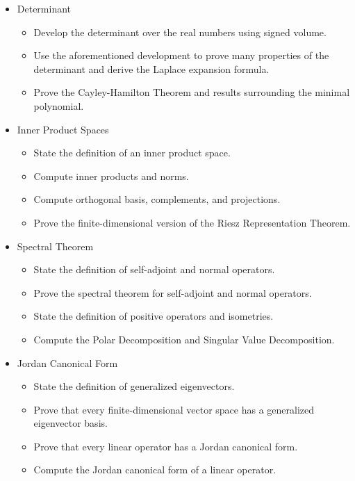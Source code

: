 \documentclass[11pt, a4paper]{article}
\begin{document}
\begin{itemize}
\item Determinant
    \begin{itemize}
    \item	Develop the determinant over the real numbers using signed volume.
    \item	Use the aforementioned development to prove many properties of the determinant and derive the Laplace expansion formula.
    \item	Prove the Cayley-Hamilton Theorem and results surrounding the minimal polynomial. 
    \end{itemize}  
    
\item Inner Product Spaces
    \begin{itemize}
    \item	State the definition of an inner product space.
    \item	Compute inner products and norms.
    \item	Compute orthogonal basis, complements, and projections. 
    \item	Prove the finite-dimensional version of the Riesz Representation Theorem. 
    \end{itemize}  
    
\item Spectral Theorem
    \begin{itemize}
    \item	State the definition of self-adjoint and normal operators.
    \item	Prove the spectral theorem for self-adjoint and normal operators.
    \item	State the definition of positive operators and isometries.
    \item	Compute the Polar Decomposition and Singular Value Decomposition. 
    \end{itemize}

\item Jordan Canonical Form
    \begin{itemize}
    \item	State the definition of generalized eigenvectors.
    \item	Prove that every finite-dimensional vector space has a generalized eigenvector basis.
    \item	Prove that every linear operator has a Jordan canonical form.
    \item	Compute the Jordan canonical form of a linear operator. 
    \end{itemize}
\end{itemize}
\end{document}
